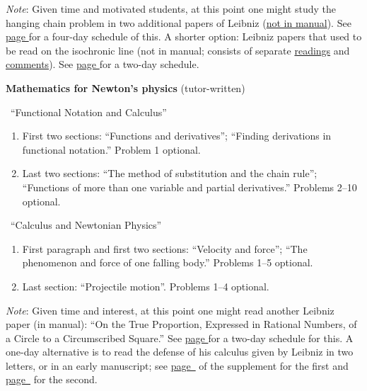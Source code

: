 \documentclass[10pt]{article}
\begin{document}
{{\small \emph{Note}: Given
       time and motivated students, at this point one might
       study the hanging
	chain problem in two additional papers of Leibniz
	(\href{https://drive.google.com/file/d/1Q06ypQH26GPMVsxn8SRQVEEn79qmUxOE/view?usp=sharing}{not in manual}).
	See \hyperref[LeibnizHang]{page
		\pageref{LeibnizHang}} for a four-day
	schedule of this.} A shorter option: Leibniz papers that used to be read on the isochronic line (not in manual; consists of separate \href{https://drive.google.com/file/d/13w3nTIpDN1F0sgImLWWRaLF5vg2cF6BL/view?usp=sharing}{readings} and \href{https://drive.google.com/file/d/140fF6SF7omRfQ-sFkhHiBlaNOiBiNvUq/view?usp=sharing}{comments}). See \hyperref[LeibnizIso]{page \pageref{LeibnizIso}} for a two-day schedule.

	\textbf{Mathematics for Newton's physics}
	(tutor-written)
	

\ ``Functional Notation and
	Calculus''
	

\begin{enumerate}[resume*]
	\item First two sections: ``Functions and
		derivatives''; ``Finding derivations in functional
		notation.'' Problem 1 optional. 
	\item Last two sections: ``The method of
		substitution and the chain rule'';
		``Functions of more than one variable and
		partial derivatives.'' Problems 2--10 optional. 
\end{enumerate}


\ ``Calculus and Newtonian Physics''
\begin{enumerate}[resume*]
	\item First paragraph and first two sections:
		``Velocity and force''; ``The phenomenon and
		force of one falling body.'' Problems 1--5
		optional.
	\item Last section: ``Projectile motion''. Problems
		1--4 optional.
\end{enumerate}
{\small \emph{Note}: Given time and interest, at this point one
might read another Leibniz paper (in manual): 
	``On the True Proportion, Expressed
	in Rational Numbers, of a Circle to a Circumscribed
	Square.'' See \hyperref[LeibnizProp]{page
		\pageref{LeibnizProp}} for a
	two-day schedule for this. A one-day alternative is
	to read the defense of his calculus given by Leibniz
	in two letters, or in an early manuscript; see
	\hyperref[supple.46]{page~\pageref{supple.46}} of
	the
supplement for the first and
\hyperref[supple.51]{page~\pageref{supple.51}} for the
second.}

}
\end{document}

